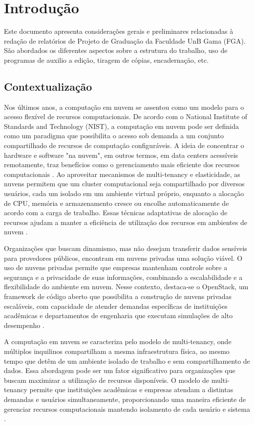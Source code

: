 \chapter{Introdução}

Este documento apresenta considerações gerais e preliminares relacionadas 
à redação de relatórios de Projeto de Graduação da Faculdade UnB Gama 
(FGA). São abordados os diferentes aspectos sobre a estrutura do trabalho, 
uso de programas de auxilio a edição, tiragem de cópias, encadernação, etc.

\section{Contextualização}

Nos últimos anos, a computação em nuvem se assentou como um modelo para o acesso flexível de recursos computacionais. De acordo com o National Institute of Standards and Technology (NIST), a computação em nuvem pode ser definida como um paradigma que possibilita o acesso sob demanda a um conjunto compartilhado de recursos de computação configuráveis. A ideia de concentrar o hardware e software "na nuvem", em outros termos, em data centers acessíveis remotamente, traz benefícios como o gerenciamento mais eficiente dos recursos computacionais \cite{mell2011}. Ao aproveitar mecanismos de multi-tenancy e elasticidade, as nuvens permitem que um cluster computacional seja compartilhado por diversos usuários, cada um isolado em um ambiente virtual próprio, enquanto a alocação de CPU, memória e armazenamento cresce ou encolhe automaticamente de acordo com a carga de trabalho. Essas técnicas adaptativas de alocação de recursos ajudam a manter a eficiência de utilização dos recursos em ambientes de nuvem \cite{dai2015, ray2013}. 

Organizações que buscam dinamismo, mas não desejam transferir dados sensíveis para provedores públicos, encontram em nuvens privadas uma solução viável. O uso de nuvens privadas permite que empresas mantenham controle sobre a segurança e a privacidade de suas informações, combinando a escalabilidade e a flexibilidade do ambiente em nuvem. Nesse contexto, destaca-se o OpenStack, um framework de código aberto que possibilita a construção de nuvens privadas escaláveis, com capacidade de atender demandas específicas de instituições acadêmicas e departamentos de engenharia que executam simulações de alto desempenho \cite{heuchert2021}. 

A computação em nuvem se caracteriza pelo modelo de multi-tenancy, onde múltiplos inquilinos compartilham a mesma infraestrutura física, ao mesmo tempo que detêm de um ambiente isolado de trabalho e sem compartilhamento de dados. Essa abordagem pode ser um fator significativo para organizações que buscam maximizar a utilização de recursos disponíveis. O modelo de multi-tenancy permite que instituições acadêmicas e empresas atendam a distintas demandas e usuários simultaneamente, proporcionando uma maneira eficiente de gerenciar recursos computacionais mantendo isolamento de cada usuário e sistema \cite{heuchert2021}.

